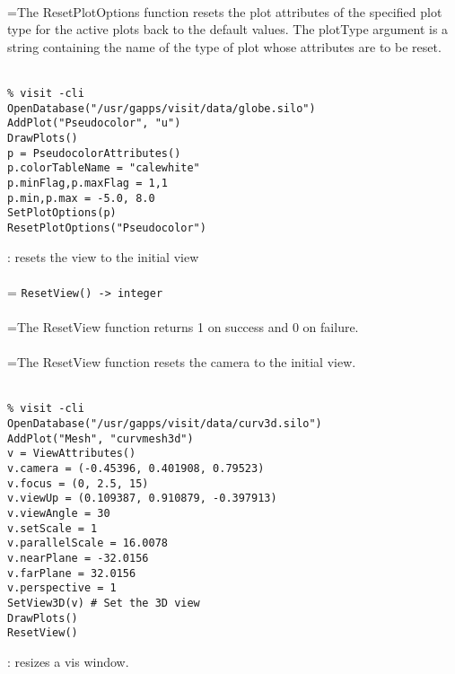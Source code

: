 \documentclass[10pt,a4paper]{report}
\begin{document}
 \\ 
\hangindent=\parindent The ResetPlotOptions function resets the plot attributes of the specified plot type for the active plots back to the default values. The plotType argument is a string containing the name of the type of plot whose attributes are to be reset. \\[-3mm] 

\\[-6mm]
\begin{verbatim}% visit -cli
OpenDatabase("/usr/gapps/visit/data/globe.silo")
AddPlot("Pseudocolor", "u")
DrawPlots()
p = PseudocolorAttributes()
p.colorTableName = "calewhite"
p.minFlag,p.maxFlag = 1,1
p.min,p.max = -5.0, 8.0
SetPlotOptions(p)
ResetPlotOptions("Pseudocolor")
\end{verbatim}
\newpage


{}
: resets the view to the initial view\\[-3mm]

 \\ 
\hangindent=\parindent 
\verb!ResetView() -> integer!\\ [-3mm]

 \\ 
\hangindent=\parindent The ResetView function returns 1 on success and 0 on failure. \\[-3mm] 

 \\ 
\hangindent=\parindent The ResetView function resets the camera to the initial view. \\[-3mm] 

\\[-6mm]
\begin{verbatim}% visit -cli
OpenDatabase("/usr/gapps/visit/data/curv3d.silo")
AddPlot("Mesh", "curvmesh3d")
v = ViewAttributes()
v.camera = (-0.45396, 0.401908, 0.79523)
v.focus = (0, 2.5, 15)
v.viewUp = (0.109387, 0.910879, -0.397913)
v.viewAngle = 30
v.setScale = 1
v.parallelScale = 16.0078
v.nearPlane = -32.0156
v.farPlane = 32.0156
v.perspective = 1
SetView3D(v) # Set the 3D view
DrawPlots()
ResetView()
\end{verbatim}
\newpage


{}
: resizes a vis window.\\[-3mm]
\end{document}

